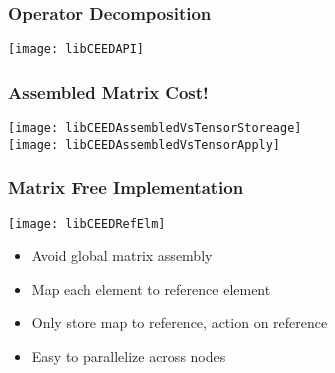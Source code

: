 \documentclass{beamer}
\begin{document}

\begin{frame}
\begin{center}
\frametitle{Operator Decomposition}

\texttt{[image: libCEEDAPI]}

\end{center}
\end{frame}


\begin{frame}
\begin{center}
\frametitle{Assembled Matrix Cost!}

\begin{multicols}{2}

\texttt{[image: libCEEDAssembledVsTensorStoreage]}\\

\texttt{[image: libCEEDAssembledVsTensorApply]}

\end{multicols}

\end{center}
\end{frame}


\begin{frame}
\begin{center}
\frametitle{Matrix Free Implementation}

\texttt{[image: libCEEDRefElm]}

\begin{itemize}

\item Avoid global matrix assembly

\item Map each element to reference element

\item Only store map to reference, action on reference

\item Easy to parallelize across nodes

\end{itemize}

\end{center}
\end{frame}

\end{document}
